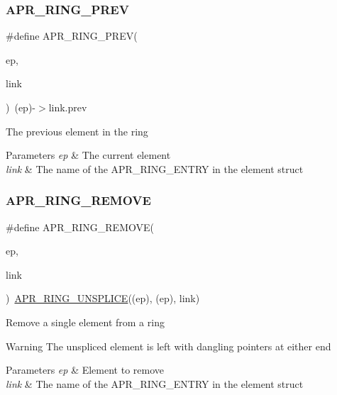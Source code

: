 \subsubsection{\texorpdfstring{A\+P\+R\+\_\+\+R\+I\+N\+G\+\_\+\+P\+R\+EV}{APR\_RING\_PREV}}
{\footnotesize\ttfamily \#define A\+P\+R\+\_\+\+R\+I\+N\+G\+\_\+\+P\+R\+EV(\begin{DoxyParamCaption}\item[{}]{ep,  }\item[{}]{link }\end{DoxyParamCaption})~(ep)-\/$>$link.\+prev}

The previous element in the ring 
\begin{DoxyParams}{Parameters}
{\em ep} & The current element \\
\hline
{\em link} & The name of the A\+P\+R\+\_\+\+R\+I\+N\+G\+\_\+\+E\+N\+T\+RY in the element struct \\
\hline
\end{DoxyParams}
\mbox{\label{group__apr__ring_gaab4a57544bdb660ec1e306137387d9d7}} 
\subsubsection{\texorpdfstring{A\+P\+R\+\_\+\+R\+I\+N\+G\+\_\+\+R\+E\+M\+O\+VE}{APR\_RING\_REMOVE}}
{\footnotesize\ttfamily \#define A\+P\+R\+\_\+\+R\+I\+N\+G\+\_\+\+R\+E\+M\+O\+VE(\begin{DoxyParamCaption}\item[{}]{ep,  }\item[{}]{link }\end{DoxyParamCaption})~\mbox{\hyperlink{group__apr__ring_ga1d725b0a9ea7ff88f771e37ec130c13b}{A\+P\+R\+\_\+\+R\+I\+N\+G\+\_\+\+U\+N\+S\+P\+L\+I\+CE}}((ep), (ep), link)}

Remove a single element from a ring \begin{DoxyWarning}{Warning}
The unspliced element is left with dangling pointers at either end 
\end{DoxyWarning}

\begin{DoxyParams}{Parameters}
{\em ep} & Element to remove \\
\hline
{\em link} & The name of the A\+P\+R\+\_\+\+R\+I\+N\+G\+\_\+\+E\+N\+T\+RY in the element struct \\
\hline
\end{DoxyParams}
\mbox{\label{group__apr__ring_ga54210090292ebafcd0a0d75d9ff1563d}} 

